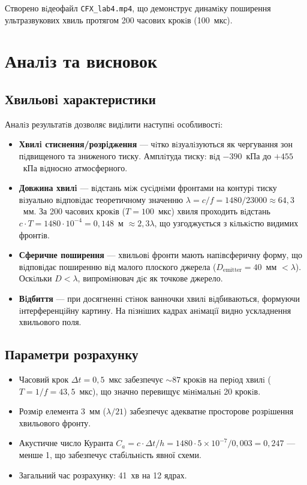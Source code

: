 Створено вiдеофайл \texttt{CFX\_lab4.mp4}, що демонструє динамiку поширення ультразвукових хвиль протягом 200 часових крокiв (100~мкс).

\section{Аналiз та висновок}

\subsection{Хвильовi характеристики}

Аналiз результатiв дозволяє видiлити наступнi особливостi:

\begin{itemize}
  \item \textbf{Хвилi стиснення/розрiдження} --- чiтко вiзуалiзуються як чергування зон пiдвищеного та зниженого тиску. Амплiтуда тиску: вiд $-390$~кПа до $+455$~кПа вiдносно атмосферного.

  \item \textbf{Довжина хвилi} --- вiдстань мiж сусiднiми фронтами на контурi тиску вiзуально вiдповiдає теоретичному значенню $\lambda = c/f = 1480/23000 \approx 64{,}3$~мм. За 200 часових крокiв ($T = 100$~мкс) хвиля проходить вiдстань $c \cdot T = 1480 \cdot 10^{-4} = 0{,}148$~м $\approx 2{,}3\lambda$, що узгоджується з кiлькiстю видимих фронтiв.

  \item \textbf{Сферичне поширення} --- хвильовi фронти мають напiвсферичну форму, що вiдповiдає поширенню вiд малого плоского джерела ($D_{\mathrm{emitter}} = 40$~мм $< \lambda$). Оскiльки $D < \lambda$, випромiнювач дiє як точкове джерело.

  \item \textbf{Вiдбиття} --- при досягненнi стiнок ванночки хвилi вiдбиваються, формуючи iнтерференцiйну картину. На пiзнiших кадрах анiмацiї видно ускладнення хвильового поля.
\end{itemize}

\subsection{Параметри розрахунку}

\begin{itemize}
  \item Часовий крок $\Delta t = 0{,}5$~мкс забезпечує $\sim 87$ крокiв на перiод хвилi ($T = 1/f = 43{,}5$~мкс), що значно перевищує мiнiмальнi 20 крокiв.
  \item Розмiр елемента 3~мм ($\lambda/21$) забезпечує адекватне просторове розрiшення хвильового фронту.
  \item Акустичне число Куранта $C_a = c \cdot \Delta t / h = 1480 \cdot 5 \times 10^{-7} / 0{,}003 = 0{,}247$ --- менше 1, що забезпечує стабiльнiсть явної схеми.
  \item Загальний час розрахунку: 41~хв на 12 ядрах.
\end{itemize}


